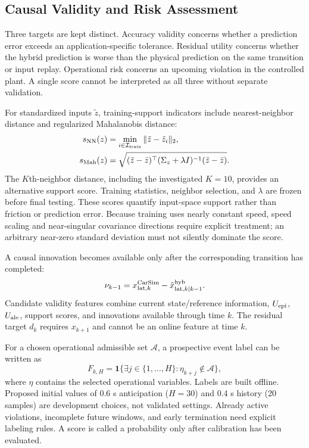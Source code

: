 \documentclass[10pt,journal]{IEEEtran}
\begin{document}
\subsection{Causal Validity and Risk Assessment}
\label{sec:validity}
Three targets are kept distinct. Accuracy validity concerns whether a prediction error exceeds an application-specific tolerance. Residual utility concerns whether the hybrid prediction is worse than the physical prediction on the same transition or input replay. Operational risk concerns an upcoming violation in the controlled plant. A single score cannot be interpreted as all three without separate validation.

For standardized inputs $\tilde z$, training-support indicators include nearest-neighbor distance and regularized Mahalanobis distance:
\begin{align}
 s_{\rm NN}(z)&=\min_{i\in\mathcal I_{\rm train}}
          \|\tilde z-\tilde z_i\|_2,\\
 s_{\rm Mah}(z)&=\sqrt{(\tilde z-\bar z)^\top
                  (\Sigma_z+\lambda I)^{-1}(\tilde z-\bar z)}.
\end{align}
The $K$th-neighbor distance, including the investigated $K=10$, provides an alternative support score. Training statistics, neighbor selection, and $\lambda$ are frozen before final testing. These scores quantify input-space support rather than friction or prediction error. Because training uses nearly constant speed, speed scaling and near-singular covariance directions require explicit treatment; an arbitrary near-zero standard deviation must not silently dominate the score.

A causal innovation becomes available only after the corresponding transition has completed:
\begin{equation}
 \nu_{k-1}=x_{{\rm lat},k}^{\rm CarSim}
   -\hat x_{{\rm lat},k|k-1}^{\rm hyb}.
\end{equation}
Candidate validity features combine current state/reference information, $U_{\rm epi}$, $U_{\rm ale}$, support scores, and innovations available through time $k$. The residual target $d_k$ requires $x_{k+1}$ and cannot be an online feature at time $k$.

For a chosen operational admissible set $\mathcal A$, a prospective event label can be written as
\begin{equation}
 F_{k,H}=\mathbf 1\{\exists j\in\{1,\ldots,H\}:
                   \eta_{k+j}\notin\mathcal A\},\label{eq:event}
\end{equation}
where $\eta$ contains the selected operational variables. Labels are built offline. Proposed initial values of 0.6 s anticipation ($H=30$) and 0.4 s history (20 samples) are development choices, not validated settings. Already active violations, incomplete future windows, and early termination need explicit labeling rules. A score is called a probability only after calibration has been evaluated.
\end{document}
